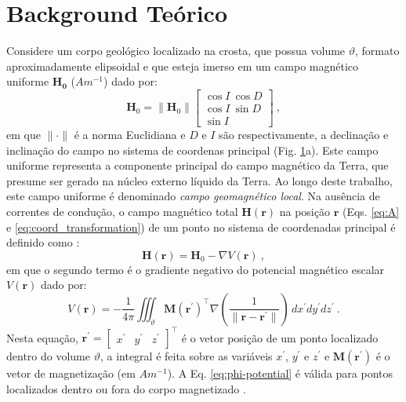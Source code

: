 \begin{figure}[hbt!]
	\label{fig:structural_orientation_angles}
\end{figure}

\section{Background Teórico}

Considere um corpo geológico localizado na crosta, que possua volume $\vartheta$, formato aproximadamente elipsoidal e que esteja imerso em um campo magnético uniforme $\mathbf{{H}_{0}}$ ($\unit{Am^{-1}}$) dado por:
\begin{equation}
\mathbf{H}_{0} = \| \mathbf{H}_{0} \| \left[
\begin{array}{c}
\cos I \: \cos D \\
\cos I \: \sin D \\
\sin I
\end{array}
\right] \: ,
\label{eq:H0}
\end{equation}
em que $\| \cdot \|$ é a norma Euclidiana e $D$ e $I$ são respectivamente, a declinação e inclinação do campo no sistema de coordenas principal (Fig. \ref{fig:structural_orientation_angles}a). Este campo uniforme representa a componente principal do campo magnético da Terra, que presume ser gerado na núcleo externo líquido da Terra. Ao longo deste trabalho, este campo uniforme é denominado \textit{campo geomagnético local}. Na ausência de correntes de condução, o campo magnético total $\mathbf{H}(\mathbf{r})$ na posição $\mathbf{r}$ (Eqs. \ref{eq:A} e
\ref{eq:coord_transformation}) de um ponto no sistema de coordenadas principal é definido como \citep{sharma1966, eskola1980, reitz1992, sttraton2007}:
\begin{equation}
\mathbf{H}(\mathbf{r}) = \mathbf{H}_{0} - \nabla V(\mathbf{r}) \: ,
\label{eq:H}
\end{equation}
em que o segundo termo é o gradiente negativo do potencial magnético escalar $V(\mathbf{r})$ dado por:
\begin{equation}
V(\mathbf{r}) = -\frac{1}{4\pi} \iiint_{\vartheta} 
\mathbf{M}(\mathbf{r}^{\prime})^{\top} 
\nabla \left(
\frac{1}{\| \mathbf{r} - \mathbf{r}^{\prime} \|}
\right) \, dx^{\prime}dy^{\prime}dz^{\prime} \: .
\label{eq:phi-potential}
\end{equation}
Nesta equação, $\mathbf{r}^{\prime} = [\begin{array}{ccc} 
x^{\prime} & y^{\prime} & z^{\prime} \end{array} ]^{\top}$
é o vetor posição de um ponto localizado dentro do volume $\vartheta$, 
a integral é feita sobre as variáveis $x^{\prime}$, $y^{\prime}$ e 
$z^{\prime}$ e 
$\mathbf{M}(\mathbf{r}^{\prime})$ é o vetor de magnetização
(em $\unit{Am^{-1}}$).
A Eq. \ref{eq:phi-potential} é válida para pontos localizados dentro ou fora do corpo magnetizado \citep{dubois1896,sttraton2007, reitz1992}.

